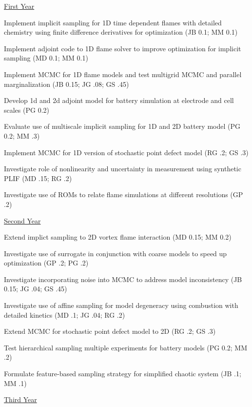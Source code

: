 \documentclass[11pt]{article}
\begin{document}
\underline{First Year}
\begin{compactitem}
\setlength{\itemsep}{0pt}\setlength{\parskip}{0pt}\setlength{\parsep}{0pt}
\item Implement implicit sampling for 1D time dependent flames with detailed chemistry using finite difference derivatives for optimization
(JB 0.1; MM 0.1)
\item Implement adjoint code to 1D flame solver to improve optimization for implicit sampling
(MD 0.1; MM 0.1)
\item Implement MCMC for 1D flame models and test multigrid MCMC and parallel marginalization
(JB 0.15; JG .08; GS .45)
\item Develop 1d and 2d adjoint model for battery simulation at electrode and cell scales
(PG 0.2)
\item Evaluate use of multiscale implicit sampling for 1D and 2D battery model
(PG 0.2; MM .3)
\item Implement MCMC for 1D version of stochastic point defect model
(RG .2; GS .3)
\item Investigate role of nonlinearity and uncertainty in measurement using synthetic PLIF
(MD .15; RG .2)
\item Investigate use of ROMs to relate flame simulations at different resolutions
(GP .2)
\end{compactitem}
%
\underline{Second Year}
\begin{compactitem}
\setlength{\itemsep}{0pt}\setlength{\parskip}{0pt}\setlength{\parsep}{0pt}
\item Extend implict sampling to 2D vortex flame interaction
(MD 0.15; MM 0.2)
\item Investigate use of surrogate in conjunction with coarse models to speed up optimization
(GP .2; PG .2)
\item Investigate incorporating noise into MCMC to address model inconsistency
(JB 0.15; JG .04; GS .45)
\item Investigate use of affine sampling for model degeneracy using combustion with detailed kinetics
(MD .1; JG .04; RG .2)
\item Extend MCMC for stochastic point defect model to 2D
(RG .2; GS .3)
\item Test hierarchical sampling multiple experiments for battery models
(PG 0.2; MM .2)
\item Formulate feature-based sampling strategy for simplified chaotic system
(JB .1; MM .1)
\end{compactitem}
%
\underline{Third Year}
\end{document}
